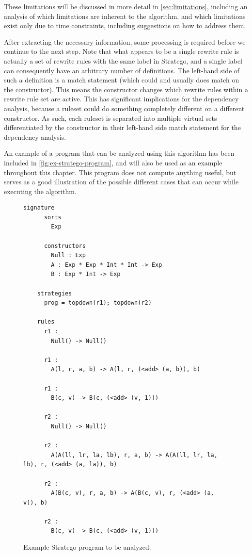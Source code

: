These limitations will be discussed in more detail in \autoref{sec:limitations}, including an analysis of which limitations are inherent to the algorithm, and which limitations exist only due to time constraints, including suggestions on how to address them.

After extracting the necessary information, some processing is required before we continue to the next step. Note that what appears to be a single rewrite rule is actually a set of rewrite rules with the same label in Stratego, and a single label can consequently have an arbitrary number of definitions. The left-hand side of such a definition is a match statement (which could and usually does match on the constructor). This means the constructor changes which rewrite rules within a rewrite rule set are active. This has significant implications for the dependency analysis, because a ruleset could do something completely different on a different constructor. As such, each ruleset is separated into multiple virtual sets differentiated by the constructor in their left-hand side match statement for the dependency analysis.

An example of a program that can be analyzed using this algorithm has been included in \autoref{fig:ex-stratego-program}, and will also be used as an example throughout this chapter. This program does not compute anything useful, but serves as a good illustration of the possible different cases that can occur while executing the algorithm.

\begin{figure}
\begin{lstlisting}[style = mystyle_ex_stratego_program]
    signature
      sorts
        Exp

      constructors
        Null : Exp
        A : Exp * Exp * Int * Int -> Exp
        B : Exp * Int -> Exp

    strategies
      prog = topdown(r1); topdown(r2)

    rules
      r1 :
        Null() -> Null()
    
      r1 :
        A(l, r, a, b) -> A(l, r, (<add> (a, b)), b)

      r1 :
        B(c, v) -> B(c, (<add> (v, 1)))

      r2 :
        Null() -> Null()

      r2 :
        A(A(ll, lr, la, lb), r, a, b) -> A(A(ll, lr, la, lb), r, (<add> (a, la)), b)

      r2 :
        A(B(c, v), r, a, b) -> A(B(c, v), r, (<add> (a, v)), b)

      r2 :
        B(c, v) -> B(c, (<add> (v, 1)))
\end{lstlisting}

\caption{Example Stratego program to be analyzed.}
\label{fig:ex-stratego-program}
\end{figure}

